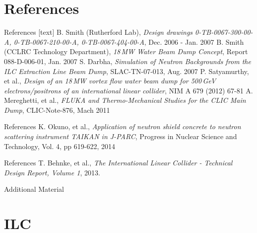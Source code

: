 \documentclass[xcolor={dvipsnames}]{beamer}
\begin{document}
\section*{References}
\begin{thebibliography}{9}
\begin{frame}{References}
[text]
 B. Smith (Rutherford Lab), \emph{Design drawings 0-TB-0067-300-00-A, 0-TB-0067-210-00-A, 0-TB-0067-404-00-A}, Dec. 2006 - Jan. 2007
 B. Smith (CCLRC Technology Department), \emph{18\,MW Water Beam Dump Concept}, Report 088-D-006-01, Jan. 2007
 S. Darbha, \emph{Simulation of Neutron Backgrounds from the ILC Extraction Line Beam Dump}, SLAC-TN-07-013, Aug. 2007
 P. Satyamurthy, et al., \emph{Design of an 18\,MW vortex flow water beam dump for 500\,GeV electrons/positrons of an international linear collider}, NIM A 679 (2012) 67-81
 A. Mereghetti, et al., \emph{FLUKA and Thermo-Mechanical Studies for the CLIC Main Dump}, CLIC-Note-876, Mach 2011
\end{frame}
\begin{frame}{References}
 K. Okuno, et al., \emph{Application of neutron shield concrete to neutron scattering instrument TAIKAN in J-PARC}, Progress in Nuclear Science and Technology, Vol. 4, pp 619-622, 2014
\end{frame}
\begin{frame}{References}
 T. Behnke, et al., \emph{The International Linear Collider - Technical Design Report, Volume 1}, 2013.
\end{frame}
\end{thebibliography}

\appendix

\begin{frame}
\begin{center}
\LARGE Additional Material
\end{center}
  \tableofcontents
\end{frame}

\section{ILC}
\end{document}
